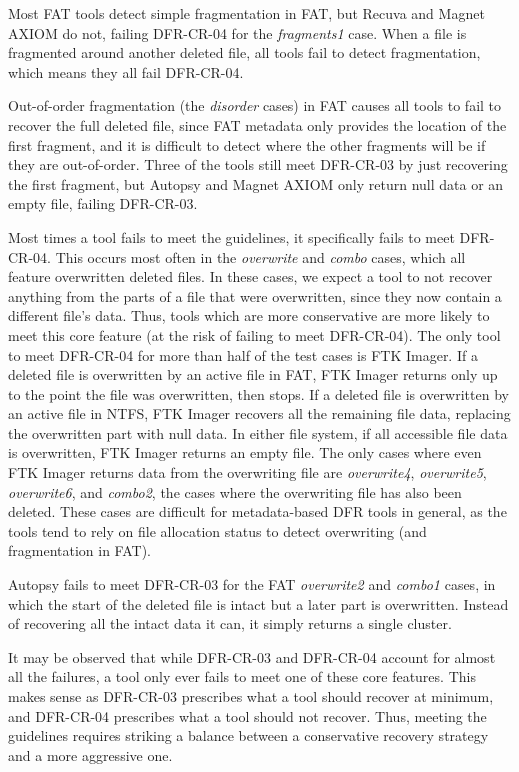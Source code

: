 Most FAT tools detect simple fragmentation in FAT, but Recuva and Magnet AXIOM do not, failing DFR-CR-04 for the \emph{fragments1} case.
When a file is fragmented around another deleted file, all tools fail to detect fragmentation, which means they all fail DFR-CR-04.

Out-of-order fragmentation (the \emph{disorder} cases) in FAT causes all tools to fail to recover the full deleted file, since FAT metadata only provides the location of the first fragment, and it is difficult to detect where the other fragments will be if they are out-of-order.
Three of the tools still meet DFR-CR-03 by just recovering the first fragment, but Autopsy and Magnet AXIOM only return null data or an empty file, failing DFR-CR-03.

Most times a tool fails to meet the guidelines, it specifically fails to meet DFR-CR-04.
This occurs most often in the \emph{overwrite} and \emph{combo} cases, which all feature overwritten deleted files.
In these cases, we expect a tool to not recover anything from the parts of a file that were overwritten, since they now contain a different file's data.
Thus, tools which are more conservative are more likely to meet this core feature (at the risk of failing to meet DFR-CR-04).
The only tool to meet DFR-CR-04 for more than half of the test cases is FTK Imager.
If a deleted file is overwritten by an active file in FAT, FTK Imager returns only up to the point the file was overwritten, then stops.
If a deleted file is overwritten by an active file in NTFS, FTK Imager recovers all the remaining file data, replacing the overwritten part with null data.
In either file system, if all accessible file data is overwritten, FTK Imager returns an empty file.
The only cases where even FTK Imager returns data from the overwriting file are \emph{overwrite4}, \emph{overwrite5}, \emph{overwrite6}, and \emph{combo2}, the cases where the overwriting file has also been deleted.
These cases are difficult for metadata-based DFR tools in general, as the tools tend to rely on file allocation status to detect overwriting (and fragmentation in FAT).

Autopsy fails to meet DFR-CR-03 for the FAT \emph{overwrite2} and \emph{combo1} cases, in which the start of the deleted file is intact but a later part is overwritten.
Instead of recovering all the intact data it can, it simply returns a single cluster.

It may be observed that while DFR-CR-03 and DFR-CR-04 account for almost all the failures, a tool only ever fails to meet one of these core features.
This makes sense as DFR-CR-03 prescribes what a tool should recover at minimum, and DFR-CR-04 prescribes what a tool should not recover.
Thus, meeting the guidelines requires striking a balance between a conservative recovery strategy and a more aggressive one.


